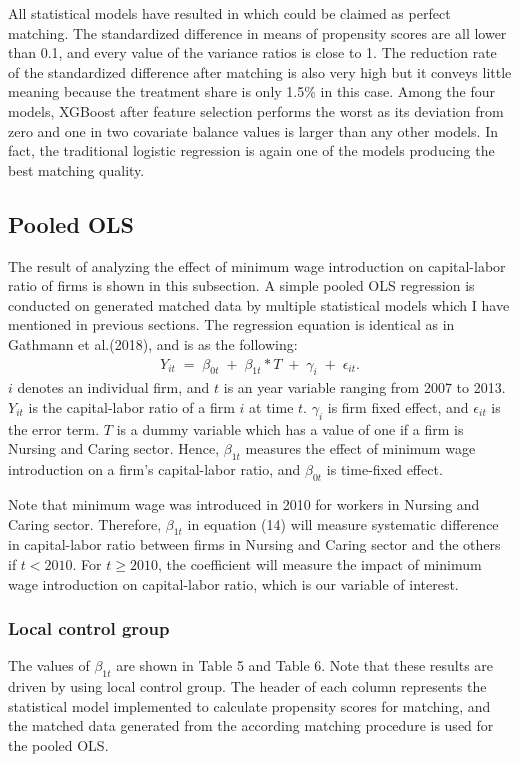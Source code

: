 \documentclass[11pt,a4paper,oneside]{article}
\begin{document}
All statistical models have resulted in which could be claimed as perfect matching. The standardized difference in means of propensity scores are all lower than 0.1, and every value of the variance ratios is close to 1. The reduction rate of the standardized difference after matching is also very high but it conveys little meaning because the treatment share is only 1.5\% in this case. Among the four models, XGBoost after feature selection performs the worst as its deviation from zero and one in two covariate balance values is larger than any other models. In fact, the traditional logistic regression is again one of the models producing the best matching quality. 
\subsection{Pooled OLS}
The result of analyzing the effect of minimum wage introduction on capital-labor ratio of firms is shown in this subsection. A simple pooled OLS regression is conducted on generated matched data by multiple statistical models which I have mentioned in previous sections. The regression equation is identical as in Gathmann et al.(2018)\cite{Gathmann2018}, and is as the following:
\begin{align}
    Y_{it} \;=\; \beta_{0t} \;+\; \beta_{1t}*T \;+\; \gamma_{i} \;+\; \epsilon_{it}.
\end{align}
$i$ denotes an individual firm, and $t$ is an year variable ranging from 2007 to 2013. $Y_{it}$ is the capital-labor ratio of a firm $i$ at time $t$. $\gamma_{i}$ is firm fixed effect, and $\epsilon_{it}$ is the error term. $T$ is a dummy variable which has a value of one if a firm is Nursing and Caring sector. Hence, $\beta_{1t}$ measures the effect of minimum wage introduction on a firm's capital-labor ratio, and $\beta_{0t}$ is time-fixed effect.
\par
Note that minimum wage was introduced in 2010 for workers in Nursing and Caring sector. Therefore, $\beta_{1t}$ in equation (14) will measure systematic difference in capital-labor ratio between firms in Nursing and Caring sector and the others if $t<2010$. For $t\geq2010$, the coefficient will measure the impact of minimum wage introduction on capital-labor ratio, which is our variable of interest.
\subsubsection{Local control group}
\par
The values of $\beta_{1t}$ are shown in Table 5 and Table 6. Note that these results are driven by using local control group. The header of each column represents the statistical model implemented to calculate propensity scores for matching, and the matched data generated from the according matching procedure is used for the pooled OLS.
\end{document}
